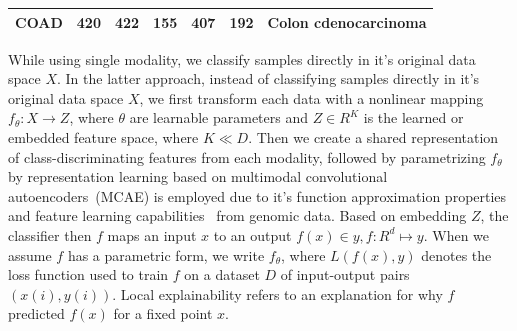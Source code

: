 \begin{table} [h]
\begin{tabular}{l|l|l|l|l|l|l}
            COAD & 420 & 422 & 155 & 407 & 192 & Colon cdenocarcinoma \\\hline
    \end{tabular}
    \vspace{-2mm}
\end{table}

\hspace*{3.5mm} While using single modality, we classify samples directly in it's original data space $X$. In the latter approach, instead of classifying samples directly in it's original data space $X$, we first transform each data with a nonlinear mapping $f_{\theta}: X \rightarrow Z$, where $\theta$ are learnable parameters and $Z \in {R}^{K}$ is the learned or embedded feature space, where $K \ll D$. Then we create a shared representation of class-discriminating features from each modality, followed by parametrizing $f_{\theta}$ by representation learning based on multimodal convolutional autoencoders~(MCAE) is employed due to it's function approximation properties and feature learning capabilities~\cite{xie2016unsupervised,karim2019drug} from genomic data. Based on embedding $Z$, the classifier then $f$ maps an input $x$ to an output $f(x) \in y, f: {R}^{d} \mapsto y$. When we assume $f$ has a parametric form, we write $f_{\theta}$, where ${L}(f(x), y)$ denotes the loss function used to train $f$ on a dataset $D$ of input-output pairs $(x(i), y(i))$. Local explainability refers to an explanation for why $f$ predicted $f(x)$ for a fixed point $x$. 


